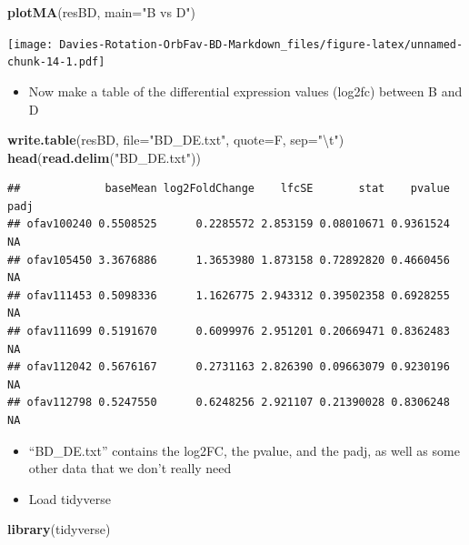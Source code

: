 \documentclass[
]{article}
\newenvironment{Shaded}{\begin{snugshade}}{\end{snugshade}}
\newcommand{\CharTok}[1]{\textcolor[rgb]{0.31,0.60,0.02}{#1}}
\newcommand{\DataTypeTok}[1]{\textcolor[rgb]{0.13,0.29,0.53}{#1}}
\newcommand{\KeywordTok}[1]{\textcolor[rgb]{0.13,0.29,0.53}{\textbf{#1}}}
\newcommand{\NormalTok}[1]{#1}
\newcommand{\StringTok}[1]{\textcolor[rgb]{0.31,0.60,0.02}{#1}}
\providecommand{\tightlist}{%
  \setlength{\itemsep}{0pt}\setlength{\parskip}{0pt}}
\begin{document}
\begin{Shaded}
\begin{Highlighting}[]
\KeywordTok{plotMA}\NormalTok{(resBD, }\DataTypeTok{main=}\StringTok{"B vs D"}\NormalTok{)}
\end{Highlighting}
\end{Shaded}

\texttt{[image: Davies-Rotation-OrbFav-BD-Markdown\_files/figure-latex/unnamed-chunk-14-1.pdf]}

\begin{itemize}
\tightlist
\item
  Now make a table of the differential expression values (log2fc)
  between B and D
\end{itemize}

\begin{Shaded}
\begin{Highlighting}[]
\KeywordTok{write.table}\NormalTok{(resBD, }\DataTypeTok{file=}\StringTok{"BD_DE.txt"}\NormalTok{, }\DataTypeTok{quote=}\NormalTok{F, }\DataTypeTok{sep=}\StringTok{"}\CharTok{\textbackslash{}t}\StringTok{"}\NormalTok{)}
\KeywordTok{head}\NormalTok{(}\KeywordTok{read.delim}\NormalTok{(}\StringTok{"BD_DE.txt"}\NormalTok{))}
\end{Highlighting}
\end{Shaded}

\begin{verbatim}
##             baseMean log2FoldChange    lfcSE       stat    pvalue padj
## ofav100240 0.5508525      0.2285572 2.853159 0.08010671 0.9361524   NA
## ofav105450 3.3676886      1.3653980 1.873158 0.72892820 0.4660456   NA
## ofav111453 0.5098336      1.1626775 2.943312 0.39502358 0.6928255   NA
## ofav111699 0.5191670      0.6099976 2.951201 0.20669471 0.8362483   NA
## ofav112042 0.5676167      0.2731163 2.826390 0.09663079 0.9230196   NA
## ofav112798 0.5247550      0.6248256 2.921107 0.21390028 0.8306248   NA
\end{verbatim}

\begin{itemize}
\item
  ``BD\_DE.txt'' contains the log2FC, the pvalue, and the padj, as well
  as some other data that we don't really need
\item
  Load tidyverse
\end{itemize}

\begin{Shaded}
\begin{Highlighting}[]
\KeywordTok{library}\NormalTok{(tidyverse)}
\end{Highlighting}
\end{Shaded}
\end{document}
